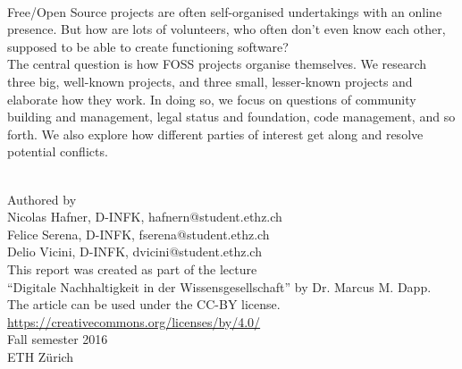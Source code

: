 \thispagestyle{empty}
\begin{center}
  {\bfseries\Huge\doctitle} \\
  \vspace{3cm}
  \parbox{0.7\linewidth}{\small
    Free/Open Source projects are often self-organised undertakings with an online presence. But how are lots of volunteers, who often don't even know each other, supposed to be able to create functioning software? \\
    
    The central question is how FOSS projects organise themselves. We research three big, well-known projects, and three small, lesser-known projects and elaborate how they work. In doing so, we focus on questions of community building and management, legal status and foundation, code management, and so forth. We also explore how different parties of interest get along and resolve potential conflicts.} \\
  \vspace{6cm}
  Authored by \\
  Nicolas Hafner, D-INFK, hafnern@student.ethz.ch \\
  Felice Serena, D-INFK,  fserena@student.ethz.ch \\
  Delio Vicini, D-INFK, dvicini@student.ethz.ch \\
  \vspace{1cm}
  This report was created as part of the lecture \\
  ``Digitale Nachhaltigkeit in der Wissensgesellschaft'' by Dr. Marcus M. Dapp. \\
  \vspace{1cm}
  The article can be used under the CC-BY license. \\
  \url{https://creativecommons.org/licenses/by/4.0/} \\
  \vspace{2cm}
  Fall semester 2016 \\
  ETH Zürich
\end{center}

\newpage

